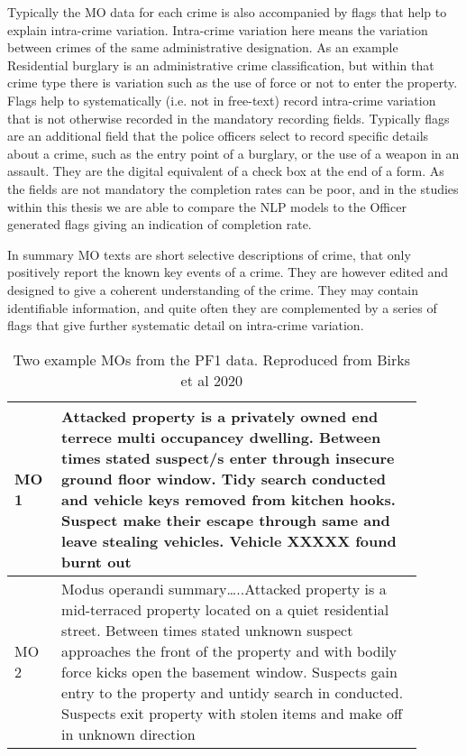 Typically the MO data for each crime is also accompanied by flags that help to explain intra-crime variation. Intra-crime variation here means the variation between crimes of the same administrative designation. As an example Residential burglary is an administrative crime classification, but within that crime type there is variation such as the use of force or not to enter the property. Flags help to systematically (i.e. not in free-text) record intra-crime variation that is not otherwise recorded in the mandatory recording fields. Typically flags are an additional field that the police officers select to record specific details about a crime, such as the entry point of a burglary, or the use of a weapon in an assault. They are the digital equivalent of a check box at the end of a form. As the fields are not mandatory the completion rates can be poor, and in the studies within this thesis we are able to compare the NLP models to the Officer generated flags giving an indication of completion rate.

In summary MO texts are short selective descriptions of crime, that only positively report the known key events of a crime. They are however edited and designed to give a coherent understanding of the crime. They may contain identifiable information, and quite often they are complemented by a series of flags that give further systematic detail on intra-crime variation.

\begin{table}[]
\centering
\begin{tabular}{p{0.1\linewidth}p{0.8\linewidth}}

\toprule
MO 1 & Attacked property is a privately owned end terrece multi occupancey dwelling. Between times stated suspect/s enter through insecure ground floor window. Tidy search conducted and vehicle keys removed from kitchen hooks. Suspect make their escape through same and leave stealing vehicles. Vehicle XXXXX found burnt out                                                               \\ \midrule
MO 2 & Modus operandi summary…..Attacked property is a mid-terraced property located on a quiet residential street. Between times stated unknown suspect approaches the front of the property and with bodily force kicks open the basement window. Suspects gain entry to the property and untidy search in conducted. Suspects exit property with stolen items and make off in unknown direction \\ \bottomrule
\end{tabular}
\caption[MO examples from PF1]{\label{tab:example_mo} Two example MOs from the PF1 data. Reproduced from Birks et al 2020}
\end{table}


